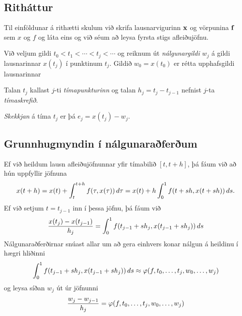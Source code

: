 \documentclass[letterpaper,10pt,icelandic]{sphinxmanual}
\begin{document}

\subsection{Ritháttur}
\label{kafli06:index-4}\label{kafli06:rithattur}
Til einföldunar á rithætti skulum við skrifa lausnarvigurinn
\({\mbox{${\bf x}$}}\) og vörpunina \({\mbox{${\bf f}$}}\) sem
\(x\) og \(f\) og láta eins og við séum að leysa fyrsta stigs
afleiðujöfnu.

Við veljum gildi \(t_0 < t_1 < \cdots < t_j<\cdots\) og reiknum út
\emph{nálgunargildi} \(w_j\) á gildi lausnarinnar \(x(t_j)\) í
punktinum \(t_j\). Gildið \(w_0=x(t_0)\) er rétta upphafsgildi
lausnarinnar

Talan \(t_j\) kallast \(j\)-ti \emph{tímapunkturinn} og talan
\(h_j=t_j-t_{j-1}\) nefnist \(j\)-ta \emph{tímaskrefið}.

\emph{Skekkjan} á tíma \(t_j\) er þá \(e_j = x(t_j)-w_j\).


\subsection{Grunnhugmyndin í nálgunaraðferðum}
\label{kafli06:grunnhugmyndin-i-nalgunaraferum}
Ef við heildum lausn afleiðujöfnunnar yfir tímabilið \([t,t+h]\), þá
fáum við að hún uppfyllir jöfnuna
\begin{gather}
\begin{split}x(t+h)=x(t)+\int_t^{t+h}f(\tau,x(\tau))\, d\tau
=x(t)+h\int_0^1f(t+sh,x(t+sh))\, ds.\end{split}\notag
\end{gather}
Ef við setjum \(t=t_{j-1}\) inn í þessa jöfnu, þá fáum við
\begin{gather}
\begin{split}\dfrac{x(t_j)-x(t_{j-1})}{h_j}=\int_0^1f(t_{j-1}+sh_j,x(t_{j-1}+sh_j))\, ds\end{split}\notag
\end{gather}
Nálgunaraðferðirnar snúast allar um að gera einhvers konar nálgun á
heildinu í hægri hliðinni
\begin{gather}
\begin{split}\int_0^1f(t_{j-1}+sh_j,x(t_{j-1}+sh_j))\, ds
  \approx \varphi(f,t_0,\dots,t_j,w_0,\dots,w_j)\end{split}\notag
\end{gather}
og leysa síðan \(w_j\) út úr jöfnunni
\begin{gather}
\begin{split}\dfrac{w_j-w_{j-1}}{h_j}=\varphi(f,t_0,\dots,t_j,w_0,\dots,w_j)\end{split}\notag
\end{gather}
\end{document}
